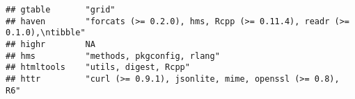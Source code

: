 \documentclass[]{article}
\begin{document}
\begin{verbatim}
## gtable       "grid"                                                                                                                                                                                                                                                                                                                                                                                                                                                                                
## haven        "forcats (>= 0.2.0), hms, Rcpp (>= 0.11.4), readr (>= 0.1.0),\ntibble"                                                                                                                                                                                                                                                                                                                                                                                                                
## highr        NA                                                                                                                                                                                                                                                                                                                                                                                                                                                                                    
## hms          "methods, pkgconfig, rlang"                                                                                                                                                                                                                                                                                                                                                                                                                                                           
## htmltools    "utils, digest, Rcpp"                                                                                                                                                                                                                                                                                                                                                                                                                                                                 
## httr         "curl (>= 0.9.1), jsonlite, mime, openssl (>= 0.8), R6"                                                                                                                                                                                                                                                                                                                                                                                                                               

\end{verbatim}
\end{document}
